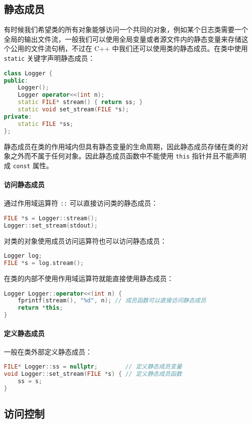 \documentclass[hyperref,UTF8]{article}
\begin{document}
\subsection{静态成员}

有时候我们希望类的所有对象能够访问一个共同的对象，例如某个日志类需要一个全局的输出文件流，一般我们可以使用全局变量或者源文件内的静态变量来存储这个公用的文件流句柄，不过在 C++ 中我们还可以使用类的静态成员。在类中使用 \texttt{static} 关键字声明静态成员：
\begin{lstlisting}[language=c++]
class Logger {
public:
    Logger();
    Logger operator<<(int n);
    static FILE* stream() { return ss; }
    static void set_stream(FILE *s);
private:
    static FILE *ss;
};
\end{lstlisting}
静态成员在类的作用域内但具有静态变量的生命周期，因此静态成员存储在类的对象之外而不属于任何对象。因此静态成员函数中不能使用 \texttt{this} 指针并且不能声明成 \texttt{const} 属性。

\paragraph{访问静态成员}

通过作用域运算符 \texttt{::} 可以直接访问类的静态成员：
\begin{lstlisting}[language=c++]
FILE *s = Logger::stream();
Logger::set_stream(stdout);
\end{lstlisting}
对类的对象使用成员访问运算符也可以访问静态成员：
\begin{lstlisting}[language=c++]
Logger log;
FILE *s = log.stream();
\end{lstlisting}
在类的内部不使用作用域运算符就能直接使用静态成员：
\begin{lstlisting}[language=c++]
Logger Logger::operator<<(int n) {
    fprintf(stream(), "%d", n); // 成员函数可以直接访问静态成员
    return *this;
}
\end{lstlisting}

\paragraph{定义静态成员}

一般在类外部定义静态成员：
\begin{lstlisting}[language=c++]
FILE* Logger::ss = nullptr;        // 定义静态成员变量
void Logger::set_stream(FILE *s) { // 定义静态成员函数
    ss = s;
}
\end{lstlisting}

\subsection{访问控制}
\end{document}
